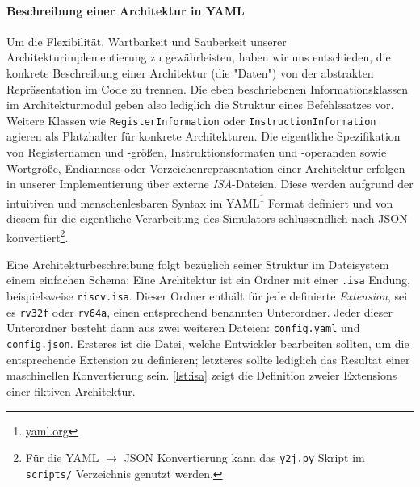 
\paragraph{Beschreibung einer Architektur in YAML}
\label{dev:arch-yaml}

Um die Flexibilität, Wartbarkeit und Sauberkeit unserer
Architekturimplementierung zu gewährleisten, haben wir uns entschieden, die
konkrete Beschreibung einer Architektur (die "Daten") von der abstrakten
Repräsentation im Code zu trennen. Die eben
beschriebenen Informationsklassen im Architekturmodul geben also lediglich die Struktur
eines Befehlssatzes vor. Weitere Klassen wie \texttt{RegisterInformation} oder
\texttt{InstructionInformation} agieren als Platzhalter für konkrete Architekturen.
Die eigentliche Spezifikation von Registernamen und -größen,
Instruktionsformaten und -operanden sowie Wortgröße, Endianness oder
Vorzeichenrepräsentation einer Architektur erfolgen in unserer Implementierung
über externe \emph{ISA}-Dateien. Diese werden aufgrund der intuitiven
und menschenlesbaren Syntax im YAML\footnote{\url{yaml.org}} Format definiert
und von diesem für die eigentliche Verarbeitung des Simulators schlussendlich
nach JSON konvertiert\footnote{Für die YAML $\rightarrow$ JSON Konvertierung kann das \texttt{y2j.py} Skript im \texttt{scripts/} Verzeichnis genutzt werden.}.

Eine Architekturbeschreibung folgt bezüglich seiner Struktur im Dateisystem
einem einfachen Schema: Eine Architektur ist ein Ordner mit einer \texttt{.isa}
Endung, beispielsweise \texttt{riscv.isa}. Dieser Ordner enthält für jede
definierte \emph{Extension}, sei es \texttt{rv32f} oder \texttt{rv64a}, einen
entsprechend benannten Unterordner. Jeder dieser Unterordner besteht dann aus
zwei weiteren Dateien: \texttt{config.yaml} und \texttt{config.json}. Ersteres
ist die Datei, welche Entwickler bearbeiten sollten, um die entsprechende
Extension zu definieren; letzteres sollte lediglich das Resultat einer
maschinellen Konvertierung sein. \autoref{lst:isa} zeigt die Definition zweier
Extensions einer fiktiven Architektur.

